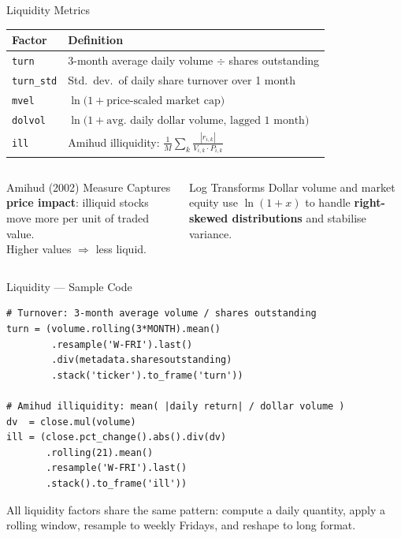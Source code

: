 \documentclass[aspectratio=169]{beamer}
\begin{document}
%
%
\begin{frame}[fragile]{Liquidity Metrics}

\renewcommand{\arraystretch}{1.4}
\begin{tabular}{@{}lp{9cm}@{}}
\toprule
\textbf{Factor} & \textbf{Definition} \\
\midrule
\texttt{turn} & 3-month average daily volume $\div$ shares outstanding \\
\texttt{turn\_std} & Std.\ dev.\ of daily share turnover over 1 month \\
\texttt{mvel} & $\ln\!\bigl(1 + \text{price-scaled market cap}\bigr)$ \\
\texttt{dolvol} & $\ln\!\bigl(1 + \text{avg.\ daily dollar volume, lagged 1 month}\bigr)$ \\
\texttt{ill} & Amihud illiquidity: $\displaystyle\frac{1}{M}\sum_{k}\frac{|r_{i,k}|}{V_{i,k}\cdot P_{i,k}}$ \\
\bottomrule
\end{tabular}

\vspace{0.4cm}

\begin{columns}[T]
\begin{block}{Amihud (2002) Measure}
Captures \textbf{price impact}: illiquid stocks move more per unit of traded value.\\
Higher values $\Rightarrow$ less liquid.
\end{block}

\begin{block}{Log Transforms}
Dollar volume and market equity use $\ln(1+x)$ to handle \textbf{right-skewed distributions} and stabilise variance.
\end{block}
\end{columns}

\end{frame}
%
%
\begin{frame}[fragile]{Liquidity --- Sample Code}

\begin{lstlisting}
# Turnover: 3-month average volume / shares outstanding
turn = (volume.rolling(3*MONTH).mean()
        .resample('W-FRI').last()
        .div(metadata.sharesoutstanding)
        .stack('ticker').to_frame('turn'))

# Amihud illiquidity: mean( |daily return| / dollar volume )
dv  = close.mul(volume)
ill = (close.pct_change().abs().div(dv)
       .rolling(21).mean()
       .resample('W-FRI').last()
       .stack().to_frame('ill'))
\end{lstlisting}

\vspace{0.2cm}

All liquidity factors share the same pattern: compute a daily quantity, apply a rolling window, resample to weekly Fridays, and reshape to long format.

\end{frame}
\end{document}
